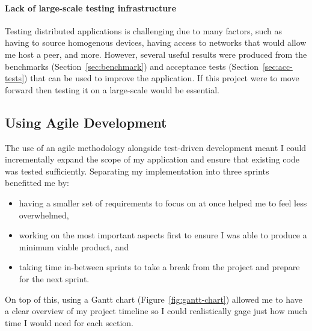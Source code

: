 \paragraph*{Lack of large-scale testing infrastructure}
Testing distributed applications is challenging due to many factors, such as having to source homogenous devices, having access to networks that would allow me host a peer, and more. However, several useful results were produced from the benchmarks (Section~\ref{sec:benchmark}) and acceptance tests (Section~\ref{sec:acc-tests}) that can be used to improve the application. If this project were to move forward then testing it on a large-scale would be essential.

\subsection*{Using Agile Development}

The use of an agile methodology alongside test-driven development meant I could incrementally expand the scope of my application and ensure that existing code was tested sufficiently. Separating my implementation into three sprints benefitted me by:

\begin{itemize}
  \item having a smaller set of requirements to focus on at once helped me to feel less overwhelmed,
  \item working on the most important aspects first to ensure I was able to produce a minimum viable product, and
  \item taking time in-between sprints to take a break from the project and prepare for the next sprint.
\end{itemize}

\newparagraph
On top of this, using a Gantt chart (Figure~\ref{fig:gantt-chart}) allowed me to have a clear overview of my project timeline so I could realistically gage just how much time I would need for each section.